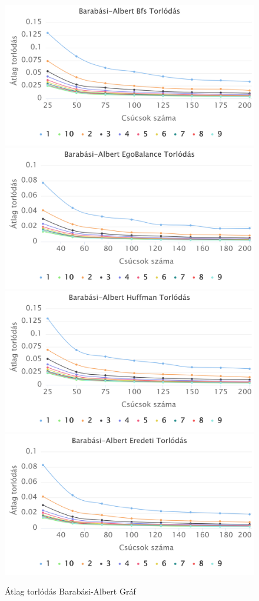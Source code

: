 \documentclass[12pt]{report}
\begin{document}
\begin{figure}[h]
	\begin{center}
		\includegraphics[width=0.49\linewidth]{pictures/barabasi_con_bfs.png}
		\includegraphics[width=0.49\linewidth]{pictures/barabasi_con_egobalance.png}
		\includegraphics[width=0.49\linewidth]{pictures/barabasi_con_huffman.png}
		\includegraphics[width=0.49\linewidth]{pictures/barabasi_con_original.png}
		\caption{Átlag torlódás Barabási-Albert Gráf}
		\label{avg-len}
	\end{center}
\end{figure}
\end{document}
